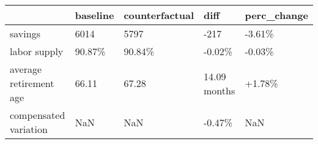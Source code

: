 \begin{tabular}{lllll}
\toprule
 & baseline & counterfactual & diff & perc_change \\
\midrule
savings & 6014 & 5797 & -217 & -3.61\% \\
labor supply & 90.87\% & 90.84\% & -0.02\% & -0.03\% \\
average retirement age & 66.11 & 67.28 & 14.09 months & +1.78\% \\
compensated variation & NaN & NaN & -0.47\% & NaN \\
\bottomrule
\end{tabular}
